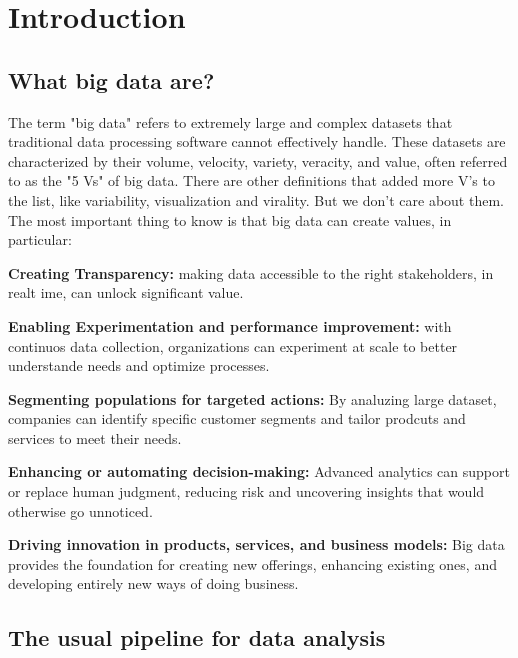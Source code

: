 \chapter{Introduction}

\section{What big data are?}

    The term "big data" refers to extremely large and complex datasets that traditional data processing software cannot effectively handle. These datasets are characterized by their volume, velocity, variety, veracity, and value, often referred to as the "5 Vs" of big data.
    There are other definitions that added more V's to the list, like variability, visualization and virality. But we don't care about them.
    The most important thing to know is that big data can create values, in particular:
    \begin{compactitemize}
        \item \textbf{Creating Transparency:} making data accessible to the right stakeholders, in realt ime, can unlock significant value.
        \item \textbf{Enabling Experimentation and performance improvement:} with continuos data collection, organizations can experiment at scale to better understande needs and optimize processes.
        \item \textbf{Segmenting populations for targeted actions:} By analuzing large dataset, companies can identify specific customer segments and tailor prodcuts and services to meet their needs.
        \item \textbf{Enhancing or automating decision-making:} Advanced analytics can support or replace human judgment, reducing risk and uncovering insights that would otherwise go unnoticed.
        \item \textbf{Driving innovation in products, services, and business models:} Big data provides the foundation for creating new offerings, enhancing existing ones, and developing entirely new ways of doing business.
    \end{compactitemize}


\section{The usual pipeline for data analysis}


